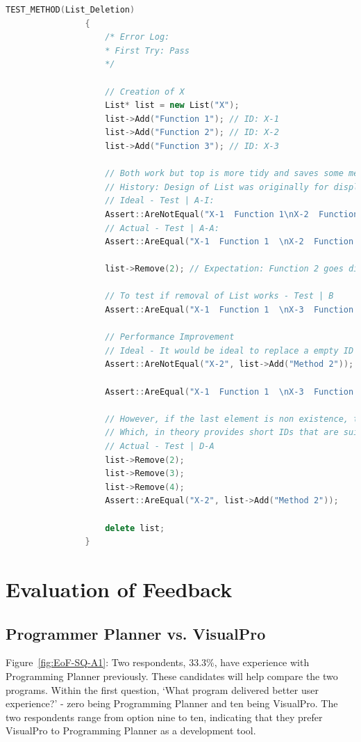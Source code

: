 \documentclass[12pt]{report} %
\begin{document}
			\begin{lstlisting}[language=c++]
				TEST_METHOD(List_Deletion)
				{
					/* Error Log:
					* First Try: Pass
					*/

					// Creation of X
					List* list = new List("X");
					list->Add("Function 1"); // ID: X-1
					list->Add("Function 2"); // ID: X-2
					list->Add("Function 3"); // ID: X-3

					// Both work but top is more tidy and saves some memory
					// History: Design of List was originally for displaying on Console and therefore saves any extra logic after calling ListAll method.
					// Ideal - Test | A-I:
					Assert::AreNotEqual("X-1  Function 1\nX-2  Function 2\nX-3  Function 3", list->ListAll().c_str());
					// Actual - Test | A-A: 
					Assert::AreEqual("X-1  Function 1  \nX-2  Function 2  \nX-3  Function 3  \n\n", list->ListAll().c_str());

					list->Remove(2); // Expectation: Function 2 goes disappears

					// To test if removal of List works - Test | B
					Assert::AreEqual("X-1  Function 1  \nX-3  Function 3  \n\n", list->ListAll().c_str());

					// Performance Improvement 
					// Ideal - It would be ideal to replace a empty ID (X-2 is non-existent, though X-4 is next) - Test | C-I
					Assert::AreNotEqual("X-2", list->Add("Method 2")); // The list should fill in the empty ID to save data.

					Assert::AreEqual("X-1  Function 1  \nX-3  Function 3  \nX-4  Method 2  \n\n", list->ListAll().c_str());

					// However, if the last element is non existence, the ID will rollback to any previously unique ID's that are not taken by the last element.)
					// Which, in theory provides short IDs that are suitable for Programming Planner's solution.
					// Actual - Test | D-A
					list->Remove(2);
					list->Remove(3);
					list->Remove(4);
					Assert::AreEqual("X-2", list->Add("Method 2"));

					delete list;
				}
			\end{lstlisting}

	\chapter{Evaluation of Feedback}
		\section{Programmer Planner vs. VisualPro}
			Figure~\ref{fig:EoF-SQ-A1}: Two respondents, 33.3\%, have experience with Programming Planner previously. These candidates will help compare the two programs. Within the first question, `What program delivered better user experience?' - zero being Programming Planner and ten being VisualPro. The two respondents range from option nine to ten, indicating that they prefer VisualPro to Programming Planner as a development tool.
\end{document}
